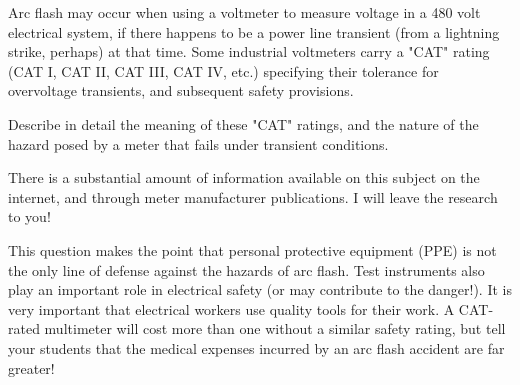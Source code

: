 

Arc flash may occur when using a voltmeter to measure voltage in a 480 volt electrical system, if there happens to be a power line transient (from a lightning strike, perhaps) at that time.  Some industrial voltmeters carry a "CAT" rating (CAT I, CAT II, CAT III, CAT IV, etc.) specifying their tolerance for overvoltage transients, and subsequent safety provisions.

Describe in detail the meaning of these "CAT" ratings, and the nature of the hazard posed by a meter that fails under transient conditions.







There is a substantial amount of information available on this subject on the internet, and through meter manufacturer publications.  I will leave the research to you!







This question makes the point that personal protective equipment (PPE) is not the only line of defense against the hazards of arc flash.  Test instruments also play an important role in electrical safety (or may contribute to the danger!).  It is very important that electrical workers use quality tools for their work.  A CAT-rated multimeter will cost more than one without a similar safety rating, but tell your students that the medical expenses incurred by an arc flash accident are far greater!




